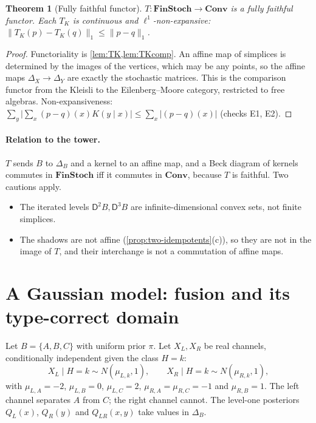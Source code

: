 \documentclass[11pt]{article}
\newtheorem{theorem}{Theorem}[section]
\theoremstyle{definition}
\newcommand{\D}{\mathsf D}
\begin{document}
\begin{theorem}[Fully faithful functor]\label{thm:T}
$T\colon\mathbf{FinStoch}\to\mathbf{Conv}$ is a fully faithful functor. Each $T_K$ is continuous and $\ell^1$-non-expansive:
$\lVert T_K(p)-T_K(q)\rVert_1\le\lVert p-q\rVert_1$.
\end{theorem}
\begin{proof}
Functoriality is \cref{lem:TK,lem:TKcomp}. An affine map of simplices is determined by the images of the vertices, which may be any
points, so the affine maps $\Delta_X\to\Delta_Y$ are exactly the stochastic matrices. This is the comparison functor from the Kleisli
to the Eilenberg--Moore category, restricted to free algebras. Non-expansiveness:
$\sum_y\lvert\sum_x(p-q)(x)K(y\mid x)\rvert\le\sum_x\lvert(p-q)(x)\rvert$ (checks E1, E2).
\end{proof}

\paragraph{Relation to the tower.} $T$ sends $B$ to $\Delta_B$ and a kernel to an affine map, and a Beck diagram of kernels commutes in
$\mathbf{FinStoch}$ iff it commutes in $\mathbf{Conv}$, because $T$ is faithful. Two cautions apply.
\begin{itemize}
\item The iterated levels $\D^2B,\D^3B$ are infinite-dimensional convex sets, not finite simplices.
\item The shadows are not affine (\cref{prop:two-idempotents}(c)), so they are not in the image of $T$, and their interchange is not a
  commutation of affine maps.
\end{itemize}

\section{A Gaussian model: fusion and its type-correct domain}\label{sec:gauss}
Let $B=\{A,B,C\}$ with uniform prior $\pi$. Let $X_L,X_R$ be real channels, conditionally independent given the class $H=k$:
\[
X_L\mid H=k\sim N(\mu_{L,k},1),\qquad X_R\mid H=k\sim N(\mu_{R,k},1),
\]
with $\mu_{L,A}=-2$, $\mu_{L,B}=0$, $\mu_{L,C}=2$, $\mu_{R,A}=\mu_{R,C}=-1$ and $\mu_{R,B}=1$. The left channel separates $A$ from $C$; the
right channel cannot. The level-one posteriors $Q_L(x)$, $Q_R(y)$ and $Q_{LR}(x,y)$ take values in $\Delta_B$.
\end{document}
